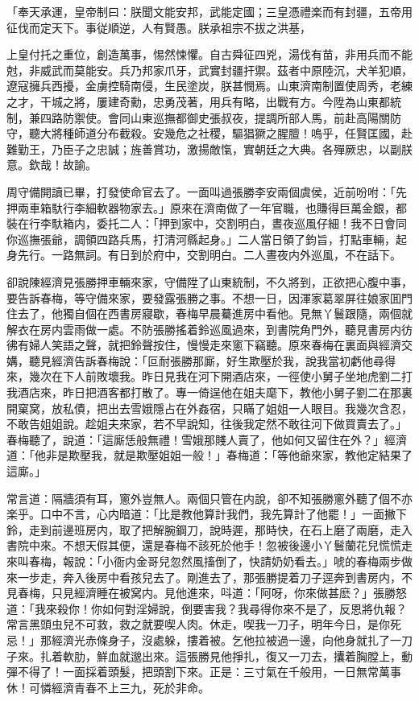 \begin{myquote}[\markfont]
「奉天承運，皇帝制曰：朕聞文能安邦，武能定國；三皇憑禮楽而有封疆，五帝用征伐而定天下。事従順逆，人有賢愚。朕承祖宗不拔之洪基，

上皇付托之重位，創造萬事，惕然悚懼。自古舜征四兇，湯伐有苗，非用兵而不能尅，非威武而莫能安。兵乃邦家爪牙，武實封疆扞禦。茲者中原陸沉，犬羊犯順，遼寇擁兵西擾，金虜控騎南侵，生民塗炭，朕甚憫焉。山東濟南制置使周秀，老練之才，干城之將，屢建奇勳，忠勇茂著，用兵有略，出戰有方。今陞為山東都統制，兼四路防禦使。會同山東巡撫都御史張叔夜，提調所部人馬，前赴高陽關防守，聽大將種師道分布截殺。安幾危之社稷，驅猖獗之腥膻！嗚乎，任賢匡國，赴難勤王，乃臣子之忠誠；旌善賞功，激揚敵愾，實朝廷之大典。各殫厥忠，以副朕意。欽哉！故諭。


\end{myquote}

周守備開讀已畢，打發使命官去了。一面叫過張勝李安兩個虞侯，近前吩咐：「先押兩車箱馱行李細軟器物家去。」原來在濟南做了一年官職，也賺得巨萬金銀，都裝在行李馱箱内，委托二人：「押到家中，交割明白，晝夜巡風仔細！我不日會同你巡撫張爺，調領四路兵馬，打清河縣起身。」二人當日領了鈞旨，打點車輛，起身先行。一路無詞。有日到於府中，交割明白。二人晝夜内外巡風，不在話下。

卻說陳經濟見張勝押車輛來家，守備陞了山東統制，不久將到，正欲把心腹中事，要告訴春梅，等守備來家，要發露張勝之事。不想一日，因渾家葛翠屏往娘家囬門住去了，他獨自個在西書房寢歇，春梅早晨驀進房中看他。見無丫鬟跟隨，兩個就解衣在房内雲雨做一處。不防張勝搖着鈴巡風過來，到書院角門外，聽見書房内彷彿有婦人笑語之聲，就把鈴聲按住，慢慢走來窻下竊聽。原來春梅在裏面與經濟交媾，聽見經濟告訴春梅說：「叵耐張勝那廝，好生欺壓於我，說我當初虧他尋得來，幾次在下人前敗壞我。昨日見我在河下開酒店來，一徑使小舅子坐地虎劉二打我酒店來，昨日把酒客都打散了。專一倚逞他在姐夫麾下，教他小舅子劉二在那裏開窠窝，放私債，把出去雪娥隱占在外姦宿，只瞞了姐姐一人眼目。我幾次含忍，不敢告姐姐說。趁姐夫來家，若不早說知，往後我定然不敢往河下做買賣去了。」春梅聽了，說道：「這廝恁般無禮！雪娥那賤人賣了，他如何又留住在外？」經濟道：「他非是欺壓我，就是欺壓姐姐一般！」春梅道：「等他爺來家，教他定結果了這廝。」

常言道：隔牆須有耳，窻外豈無人。兩個只管在内說，卻不知張勝窻外聽了個不亦楽乎。口中不言，心内暗道：「比是教他算計我們，我先算計了他罷！」一面撇下鈴，走到前邊班房内，取了把解腕鋼刀，說時遲，那時快，在石上磨了兩磨，走入書院中來。不想天假其便，還是春梅不該死於他手！忽被後邊小丫鬟蘭花兒慌慌走來叫春梅，報說：「小衙内金哥兒忽然風搐倒了，快請奶奶看去。」唬的春梅兩步做來一步走，奔入後房中看孩兒去了。剛進去了，那張勝提着刀子逕奔到書房内，不見春梅，只見經濟睡在被窝内。見他進來，呌道：「阿呀，你來做甚麽？」張勝怒道：「我來殺你！你如何對淫婦說，倒要害我？我尋得你來不是了，反恩將仇報？常言黑頭虫兒不可救，救之就要喫人肉。休走，喫我一刀子，明年今日，是你死忌！」那經濟光赤條身子，沒處躲，摟着被。乞他拉被過一邊，向他身就扎了一刀子來。扎着軟肋，鮮血就邈出來。這張勝見他掙扎，復又一刀去，攮着胸膛上，動彈不得了！一面採着頭髮，把頭割下來。正是：三寸氣在千般用，一日無常萬事休！可憐經濟青春不上三九，死於非命。


